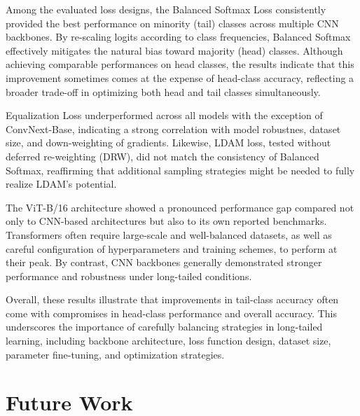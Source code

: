 Among the evaluated loss designs, the Balanced Softmax Loss consistently provided the best performance on minority (tail) classes across multiple CNN backbones. By re-scaling logits according to class frequencies, Balanced Softmax effectively mitigates the natural bias toward majority (head) classes. Although achieving comparable performances on head classes, the results indicate that this improvement sometimes comes at the expense of head-class accuracy, reflecting a broader trade-off in optimizing both head and tail classes simultaneously. 


Equalization Loss underperformed across all models with the exception of ConvNext-Base, indicating a strong correlation with model robustnes, dataset size, and down-weighting of gradients. Likewise, LDAM loss, tested without deferred re-weighting (DRW), did not match the consistency of Balanced Softmax, reaffirming that additional sampling strategies might be needed to fully realize LDAM's potential.

The ViT-B/16 architecture showed a pronounced performance gap compared not only to CNN-based architectures but also to its own reported benchmarks. Transformers often require large-scale and well-balanced datasets, as well as careful configuration of hyperparameters and training schemes, to perform at their peak. By contrast, CNN backbones generally demonstrated stronger performance and robustness under long-tailed conditions.

\noindent Overall, these results illustrate that improvements in tail-class accuracy often come with compromises in head-class performance and overall accuracy. This underscores the importance of carefully balancing strategies in long-tailed learning, including backbone architecture, loss function design, dataset size, parameter fine-tuning, and optimization strategies.

\section{Future Work}
